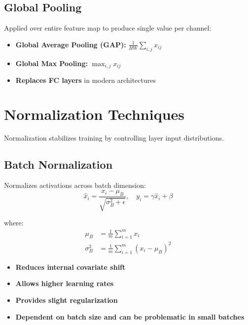 \subsection{Global Pooling}

Applied over entire feature map to produce single value per channel:
\begin{itemize}
    \item \textbf{Global Average Pooling (GAP):} $\frac{1}{HW}\sum_{i,j} x_{ij}$
    \item \textbf{Global Max Pooling:} $\max_{i,j} x_{ij}$
    \item \textbf{Replaces FC layers} in modern architectures
\end{itemize}

\section{Normalization Techniques}

Normalization stabilizes training by controlling layer input distributions.

\subsection{Batch Normalization}

Normalizes activations across batch dimension:
\begin{equation}
\hat{x}_i = \frac{x_i - \mu_B}{\sqrt{\sigma_B^2 + \epsilon}}, \quad y_i = \gamma \hat{x}_i + \beta
\end{equation}

where:
\begin{align}
\mu_B &= \frac{1}{m}\sum_{i=1}^{m} x_i \\
\sigma_B^2 &= \frac{1}{m}\sum_{i=1}^{m}(x_i - \mu_B)^2
\end{align}

\begin{properties}
\begin{itemize}
    \item \textbf{Reduces internal covariate shift}
    \item \textbf{Allows higher learning rates}
    \item \textbf{Provides slight regularization}
    \item \textbf{Dependent on batch size and can be problematic in small batches}
\end{itemize}
\end{properties}

